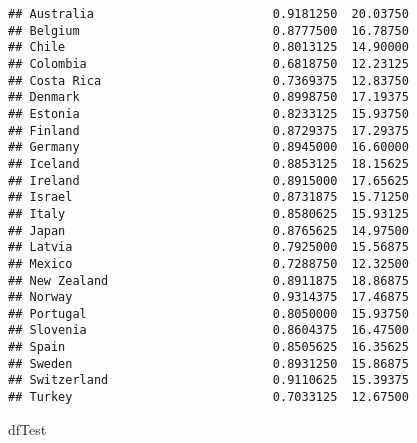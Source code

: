 \documentclass[
]{article}
\newenvironment{Shaded}{\begin{snugshade}}{\end{snugshade}}
\newcommand{\NormalTok}[1]{#1}
\begin{document}
\begin{verbatim}
## Australia                         0.9181250  20.03750
## Belgium                           0.8777500  16.78750
## Chile                             0.8013125  14.90000
## Colombia                          0.6818750  12.23125
## Costa Rica                        0.7369375  12.83750
## Denmark                           0.8998750  17.19375
## Estonia                           0.8233125  15.93750
## Finland                           0.8729375  17.29375
## Germany                           0.8945000  16.60000
## Iceland                           0.8853125  18.15625
## Ireland                           0.8915000  17.65625
## Israel                            0.8731875  15.71250
## Italy                             0.8580625  15.93125
## Japan                             0.8765625  14.97500
## Latvia                            0.7925000  15.56875
## Mexico                            0.7288750  12.32500
## New Zealand                       0.8911875  18.86875
## Norway                            0.9314375  17.46875
## Portugal                          0.8050000  15.93750
## Slovenia                          0.8604375  16.47500
## Spain                             0.8505625  16.35625
## Sweden                            0.8931250  15.86875
## Switzerland                       0.9110625  15.39375
## Turkey                            0.7033125  12.67500
\end{verbatim}

\begin{Shaded}
\begin{Highlighting}[]
\NormalTok{dfTest}
\end{Highlighting}
\end{Shaded}
\end{document}
